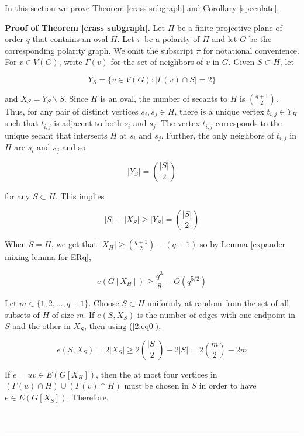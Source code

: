 \documentclass[12pt]{article}
\newenvironment{proof}[1][Proof]{\noindent\textbf{#1.} }
{\hfill \ \rule{0.5em}{0.5em}}
\begin{document}
In this section we prove Theorem \ref{crass subgraph} and Corollary \ref{speculate}.


\begin{proof}[Proof of Theorem \ref{crass subgraph}]
    Let $\Pi$ be a finite projective plane of order $q$ that contains an oval $H$.  Let $\pi$ be a polarity of $\Pi$ and let $G$ be the corresponding polarity graph.  We omit the subscript $\pi$ for notational convenience.  For $v \in V(G)$, write $\Gamma (v)$ for the set of neighbors of $v$ in $G$.  Given $S \subset H$, let

    $$ Y_S = \{ v \in V(G) : | \Gamma (v) \cap S | = 2 \} $$

    and $X_S = Y_S \backslash S$.  Since $H$ is an oval, the number of secants to $H$ is $\binom{q+1}{2}$.
    Thus, for any pair of distinct vertices $s_i , s_j \in H$, there is a unique vertex $t_{i,j} \in Y_H$ such that
    $t_{i,j}$ is adjacent to both $s_i$ and $s_j$.  The vertex $t_{i,j}$ corresponds to the unique secant that intersects $H$ at
    $s_i$ and $s_j$.  Further, the only neighbors of $t_{i,j}$ in $H$ are $s_i$ and $s_j$ and so

    $$ |Y_S | = \binom{ |S| }{2} $$

    for any $S \subset H$.  This implies

    \begin{equation}\label{2:eq0}
        |S| + |X_S| \geq |Y_S| = \binom{ |S| }{2}
    \end{equation}

    When $S = H$, we get that $|X_H| \geq \binom{q+1}{2}  - (q  + 1)$ so by Lemma \ref{expander mixing lemma for ERq},

    \begin{equation}\label{22:eq1}
        e( G[ X_H] ) \geq \frac{q^3}{8} - O (q^{5/2})
    \end{equation}

    Let $m \in \{ 1,2 , \dots ,  q + 1 \}$.  Choose $S \subset H$ uniformly at random from the set of all subsets of $H$ of size $m$.  If
    $e(S , X_S)$ is the number of edges with one endpoint in $S$ and the other in $X_S$, then using (\ref{2:eq0}),

    \begin{equation}\label{2:eq1}
        e(S , X_S) = 2 |X_S| \geq 2 \binom{ |S| }{2} - 2 |S| = 2 \binom{m}{2} - 2m
    \end{equation}

    If $e = uv \in E( G[X_H] )$, then the at most four vertices in $( \Gamma (u) \cap H ) \cup ( \Gamma (v) \cap H )$ must be chosen in $S$ in order to have $e \in E( G [ X_S] )$.  Therefore,


\end{proof}
\end{document}
